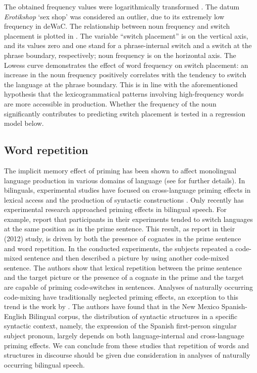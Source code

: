 The obtained frequency values were logarithmically transformed \citep[cf.][31]{baayen-analyzing}. The datum \textit{Erotikshop} `sex shop' was considered an outlier, due to its extremely low frequency in deWaC. The relationship between noun frequency and switch placement is plotted in . The variable “switch placement” is on the vertical axis, and its values zero and one stand for a phrase-internal switch and a switch at the phrase boundary, respectively; noun frequency is on the horizontal axis. The Lowess curve demonstrates the effect of word frequency on switch placement: an increase in the noun frequency positively correlates with the tendency to switch the language at the phrase boundary. This is in line with the aforementioned hypothesis that the lexicogrammatical patterns involving high-frequency words are more accessible in production. Whether the frequency of the noun significantly contributes to predicting switch placement is tested in a regression model below.

\subsection{Word repetition}

The implicit memory effect of priming has been shown to affect monolingual language production in various domains of language (see  for further details). In bilinguals, experimental studies have focused on cross-language priming effects in lexical access \citep{dijkstra-etal98, kroll-stewart94, vanhell-degroot98} and the production of syntactic constructions \citep{loebell-bock03, salamoura-williams06, schoonbaert-etal07}. Only recently has experimental research approached priming effects in bilingual speech. For example, \citet{kootstra-etal10} report that participants in their experiments tended to switch languages at the same position as in the prime sentence. This result, as \citeauthor{kootstra-etal12} report in their (2012) study, is driven by both the presence of cognates in the prime sentence and word repetition. In the conducted experiments, the subjects repeated a code-mixed sentence and then described a picture by using another code-mixed sentence. The authors show that lexical repetition between the prime sentence and the target picture or the presence of a cognate in the prime and the target are capable of priming code-switches in sentences. Analyses of naturally occurring code-mixing have traditionally neglected priming effects, an exception to this trend is the work by \citet{torres-travis}. The authors have found that in the New Mexico Spanish-English Bilingual corpus, the distribution of syntactic structures in a specific syntactic context, namely, the expression of the Spanish first-person singular subject pronoun, largely depends on both language-internal and cross-language priming effects. We can conclude from these studies that repetition of words and structures in discourse should be given due consideration in analyses of naturally occurring bilingual speech. 

